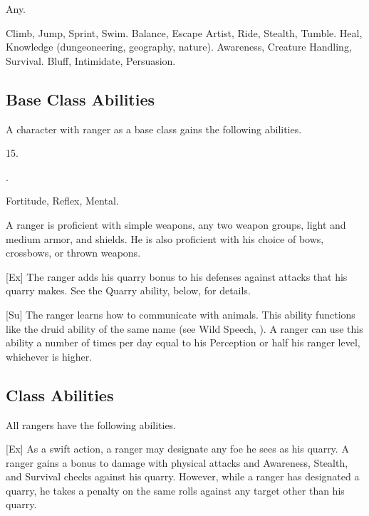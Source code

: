      Any.

     Climb, Jump, Sprint, Swim.
     Balance, Escape Artist, Ride, Stealth, Tumble.
     Heal, Knowledge (dungeoneering, geography, nature).
     Awareness, Creature Handling, Survival.
     Bluff, Intimidate, Persuasion.

    \subsection{Base Class Abilities}
        A character with ranger as a base class gains the following abilities.

         15.

         .

          Fortitude,  Reflex,  Mental.

        A ranger is proficient with simple weapons, any two weapon groups, light and medium armor, and shields.
        He is also proficient with his choice of bows, crossbows, or thrown weapons.

        [Ex]
        The ranger adds his quarry bonus to his defenses against attacks that his quarry makes.
        See the Quarry ability, below, for details.

        [Su]
        The ranger learns how to communicate with animals.
        This ability functions like the druid ability of the same name (see Wild Speech, ).
        A ranger can use this ability a number of times per day equal to his Perception or half his ranger level, whichever is higher.

    \subsection{Class Abilities}
        All rangers have the following abilities.

        [Ex]
        As a swift action, a ranger may designate any foe he sees as his quarry.
        A ranger gains a  bonus to damage with physical attacks and Awareness, Stealth, and Survival checks against his quarry.
        However, while a ranger has designated a quarry, he takes a  penalty on the same rolls against any target other than his quarry.


